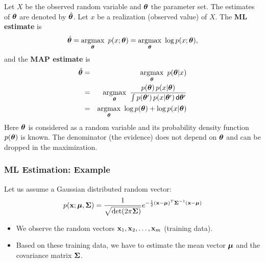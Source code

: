   Let $X$ be the observed random variable and $\bm{\theta}$ the parameter set. The estimates of $\bm{\theta}$ are denoted by $\hat{\bm{\theta}}$.
  Let $x$ be a realization (observed value) of $X$.
%
  The \textbf{ML estimate} is
  \begin{displaymath}
    \hat{\bm{\theta}}= \operatorname*{argmax}_{\bm{\theta}}\ p(x; \bm{\theta}) = \operatorname*{argmax}_{\bm{\theta}}\ \log p(x; \bm{\theta}),
  \end{displaymath}
  and the \textbf{MAP estimate} is
      {\small
        \begin{eqnarray*}
          \hat{\bm{\theta}} &=& \operatorname*{argmax}_{\bm{\theta}}\ p(\bm{\theta}|{x})\\
                &=& \operatorname*{argmax}_{\bm{\theta}}\ \frac{p(\bm{\theta})\,p(x|\bm{\theta})}{\int p(\bm{\theta}')\,p(x|\bm{\theta}')\,\mathsf{d}\bm{\theta}'}\\
                &=& \operatorname*{argmax}_{\bm{\theta}}\ \log p(\bm{\theta}) + \log p(x|\bm{\theta})
        \end{eqnarray*}
      }
  Here $\bm{\theta}$ is considered as a random variable and its probability density function $p(\bm{\theta})$ is known. The denominator (the evidence) does not depend on $\bm{\theta}$ and can be dropped in the maximization.
     

  \subsubsection{ML Estimation: Example}

    Let us assume a Gaussian distributed random vector:
%
    \begin{displaymath}
      p(\bm{\mathrm{x}};\bm{\mathrm{\mu}}, \mathbf{\Sigma}) = \frac{1}{\sqrt{\det(2\pi\mathbf{\Sigma})}}
        e^{-\frac{1}{2}(\bm{\mathrm{x}}-\bm{\mathrm{\mu}})^T \mathbf{\Sigma}^{-1} (\bm{\mathrm{x}}-\bm{\mathrm{\mu}})}  
    \end{displaymath}
%    
    \begin{itemize}
      \item We observe the random vectors $\bm{\mathrm{x}}_1, \bm{\mathrm{x}}_2, \dots, \bm{\mathrm{x}}_m$ (training data).  
      \item Based on these training data, we have to estimate the mean vector $\bm{\mathrm{\mu}}$ and the covariance matrix $\mathbf{\Sigma}$.
    \end{itemize}

